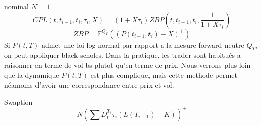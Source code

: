nominal $N = 1$
$$ CPL(t, t_{i-1}, t_i, \tau_i, X) = (1+X \tau_i) ZBP(t, t_{i-1}, t_i, \frac{1}{1+X \tau_i})$$
$$ZBP = \mathbb{E}^{Q_T}(  (P(t_{i-1}, t_i) - X)^+ )$$
Si $P(t, T)$ admet une loi log normal par rapport a la mesure forward neutre $Q_T$, on peut appliquer black scholes. Dans la pratique, les trader sont habitués a raisonner en terme de vol bs plutot qu'en terme de prix. Nous verrons plus loin que la dynamique $P(t, T)$ est plus complique, mais cette methode permet néamoins d'avoir une correspondance entre prix et vol.


\begin{defn}
Swaption
$$ N (\sum D_t^{T_i} \tau_i (L(T_{i-1}) - K))^+ $$
\end{defn}

